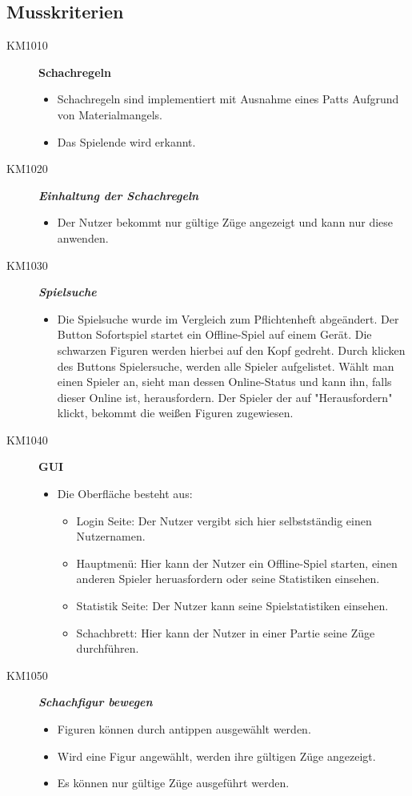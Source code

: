 \documentclass[parskip=full]{scrartcl}
\begin{document}
\subsection{Musskriterien}
\begin{description}
	\item[KM1010] \textbf{Schachregeln}
	\begin{itemize}
		\item Schachregeln sind implementiert mit Ausnahme eines Patts Aufgrund von Materialmangels.
		\item Das Spielende wird erkannt.
	\end{itemize}
	\item[KM1020] \textbf{\textit{Einhaltung der Schachregeln}}
	\begin{itemize}
		\item Der Nutzer bekommt nur gültige Züge angezeigt und kann nur diese anwenden.
	\end{itemize}
	\item[KM1030] \textbf{\textit{Spielsuche}}
	\begin{itemize}
		\item Die Spielsuche wurde im Vergleich zum Pflichtenheft abgeändert.
		Der Button Sofortspiel startet ein Offline-Spiel auf einem Gerät. Die schwarzen Figuren werden hierbei auf den Kopf gedreht.
		Durch klicken des Buttons Spielersuche, werden alle Spieler aufgelistet.
		Wählt man einen Spieler an, sieht man dessen Online-Status und kann ihn, falls dieser Online ist, herausfordern. Der Spieler der auf "Herausfordern" klickt, bekommt die weißen Figuren zugewiesen.
	\end{itemize}
	\item[KM1040] \textbf{GUI}
	\begin{itemize}
		\item Die Oberfläche besteht aus:
		\begin{itemize}		
			\item Login Seite: Der Nutzer vergibt sich hier selbstständig einen Nutzernamen.
			
			\item Hauptmenü: Hier kann der Nutzer ein Offline-Spiel starten, einen anderen Spieler heruasfordern oder seine Statistiken einsehen.
			
			\item Statistik Seite: Der Nutzer kann seine Spielstatistiken einsehen.
			
			\item Schachbrett: Hier kann der Nutzer in einer Partie seine Züge durchführen.
			
		\end{itemize}
	\end{itemize}
	\item[KM1050] \textbf{\textit{Schachfigur bewegen}}
	\begin{itemize}
		\item Figuren können durch antippen ausgewählt werden.
		\item Wird eine Figur angewählt, werden ihre gültigen Züge angezeigt.
		\item Es können nur gültige Züge ausgeführt werden.
	\end{itemize}
\end{description}
\end{document}
